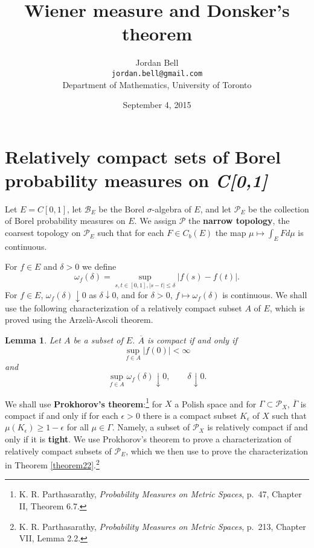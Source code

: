 \documentclass{article}
\newtheorem{lemma}[theorem]{Lemma}
\theoremstyle{definition}
\begin{document}
\title{Wiener measure and Donsker's theorem}
\author{Jordan Bell\\ \texttt{jordan.bell@gmail.com}\\Department of Mathematics, University of Toronto}
\date{September 4, 2015}

\maketitle

\section{Relatively compact sets of Borel probability measures on {\em C[0,1]}}
Let $E=C[0,1]$, let $\mathscr{B}_E$ be the Borel $\sigma$-algebra of $E$, and let $\mathscr{P}_E$ be the collection of Borel probability measures on $E$. We assign $\mathscr{P}$ the \textbf{narrow topology}, the coarsest topology
on $\mathscr{P}_E$ such that for each $F \in C_b(E)$ the map $\mu \mapsto \int_E F d\mu$ is continuous.



For $f \in E$ and $\delta>0$ we define
\[
\omega_f(\delta) = \sup_{s,t \in [0,1], |s-t| \leq \delta} |f(s)-f(t)|.
\]
For $f \in E$, $\omega_f(\delta) \downarrow 0$ as $\delta \downarrow 0$, and for $\delta>0$,
$f \mapsto \omega_f(\delta)$ is continuous.
We shall use the following characterization of a relatively compact subset $A$ of $E$, which is proved using the Arzel\`a-Ascoli theorem.

\begin{lemma}
Let $A$ be a  subset of $E$. $\overline{A}$ is compact if and only if
\[
\sup_{f \in A} |f(0)| < \infty
\]
and
\[
\sup_{f \in A} \omega_f(\delta) \downarrow 0,\qquad \delta \downarrow 0.
\]
\label{modulus}
\end{lemma}

We shall use \textbf{Prokhorov's theorem}:\footnote{K. R.
Parthasarathy, {\em Probability Measures on Metric Spaces}, p.~47, Chapter II, Theorem 6.7.}
for $X$ a Polish space and for $\Gamma \subset \mathscr{P}_X$, 
$\overline{\Gamma}$ is compact if and only if for each $\epsilon>0$ there is a compact
subset $K_\epsilon$ of $X$ such that $\mu(K_\epsilon) \geq 1-\epsilon$ for all $\mu \in \Gamma$. 
Namely, a subset of $\mathscr{P}_X$ is relatively compact if and only if it is \textbf{tight}.
We use Prokhorov's theorem to   prove a characterization of relatively compact subsets of $\mathscr{P}_E$, which we then use 
to prove the characterization  in Theorem \ref{theorem22}.\footnote{K. R.
Parthasarathy, {\em Probability  Measures on Metric Spaces}, p.~213, Chapter VII, Lemma 2.2.}
\end{document}
